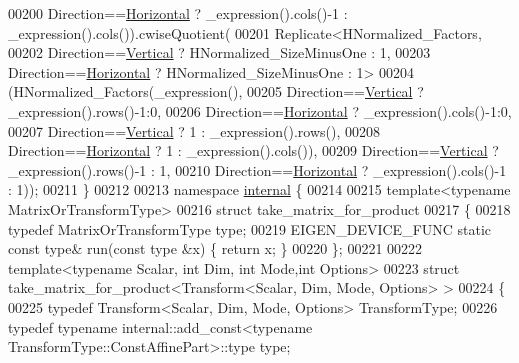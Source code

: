 \begin{DoxyCode}
00200       Direction==\hyperlink{group__enums_ggad49a7b3738e273eb00932271b36127f7aae8a16b3b9272683c1162915f6d892be}{Horizontal} ? \_expression().cols()-1 : \_expression().cols()).cwiseQuotient(
00201       Replicate<HNormalized\_Factors,
00202                 Direction==\hyperlink{group__enums_ggad49a7b3738e273eb00932271b36127f7addca718e0564723df21d61b94b1198be}{Vertical}   ? HNormalized\_SizeMinusOne : 1,
00203                 Direction==\hyperlink{group__enums_ggad49a7b3738e273eb00932271b36127f7aae8a16b3b9272683c1162915f6d892be}{Horizontal} ? HNormalized\_SizeMinusOne : 1>
00204         (HNormalized\_Factors(\_expression(),
00205           Direction==\hyperlink{group__enums_ggad49a7b3738e273eb00932271b36127f7addca718e0564723df21d61b94b1198be}{Vertical}    ? \_expression().rows()-1:0,
00206           Direction==\hyperlink{group__enums_ggad49a7b3738e273eb00932271b36127f7aae8a16b3b9272683c1162915f6d892be}{Horizontal}  ? \_expression().cols()-1:0,
00207           Direction==\hyperlink{group__enums_ggad49a7b3738e273eb00932271b36127f7addca718e0564723df21d61b94b1198be}{Vertical}    ? 1 : \_expression().rows(),
00208           Direction==\hyperlink{group__enums_ggad49a7b3738e273eb00932271b36127f7aae8a16b3b9272683c1162915f6d892be}{Horizontal}  ? 1 : \_expression().cols()),
00209          Direction==\hyperlink{group__enums_ggad49a7b3738e273eb00932271b36127f7addca718e0564723df21d61b94b1198be}{Vertical}   ? \_expression().rows()-1 : 1,
00210          Direction==\hyperlink{group__enums_ggad49a7b3738e273eb00932271b36127f7aae8a16b3b9272683c1162915f6d892be}{Horizontal} ? \_expression().cols()-1 : 1));
00211 \}
00212 
00213 \textcolor{keyword}{namespace }\hyperlink{namespaceinternal}{internal} \{
00214 
00215 \textcolor{keyword}{template}<\textcolor{keyword}{typename} MatrixOrTransformType>
00216 \textcolor{keyword}{struct }take\_matrix\_for\_product
00217 \{
00218   \textcolor{keyword}{typedef} MatrixOrTransformType type;
00219   EIGEN\_DEVICE\_FUNC \textcolor{keyword}{static} \textcolor{keyword}{const} type& run(\textcolor{keyword}{const} type &x) \{ \textcolor{keywordflow}{return} x; \}
00220 \};
00221 
00222 \textcolor{keyword}{template}<\textcolor{keyword}{typename} Scalar, \textcolor{keywordtype}{int} Dim, \textcolor{keywordtype}{int} Mode,\textcolor{keywordtype}{int} Options>
00223 \textcolor{keyword}{struct }take\_matrix\_for\_product<Transform<Scalar, Dim, Mode, Options> >
00224 \{
00225   \textcolor{keyword}{typedef} Transform<Scalar, Dim, Mode, Options> TransformType;
00226   \textcolor{keyword}{typedef} \textcolor{keyword}{typename} internal::add\_const<typename TransformType::ConstAffinePart>::type type;

\end{DoxyCode}
